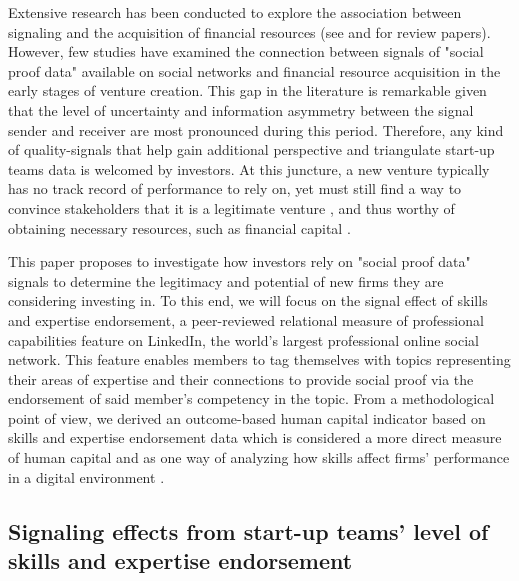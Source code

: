\documentclass[12pt]{article}
\begin{document}
Extensive research has been conducted to explore the association between signaling and the acquisition of financial resources (see \citep{connelly2011signaling} and \citet{colombo2021use} for review papers). However, few studies have examined the connection between signals of "social proof data" available on social networks and financial resource acquisition in the early stages of venture creation. This gap in the literature is remarkable given that the level of uncertainty \citep{matusik2008values} and information asymmetry between the signal sender and receiver \citep{spence2002signaling} are most pronounced during this period. Therefore, any kind of quality-signals that help gain additional perspective and triangulate start-up teams data is welcomed by investors. At this juncture, a new venture typically has no track record of performance to rely on, yet must still find a way to convince stakeholders that it is a legitimate venture \citep{becker2015new}, and thus worthy of obtaining necessary resources, such as financial capital \citep{ko2018signaling}.

This paper proposes to investigate how investors rely on "social proof data" signals to determine the legitimacy and potential of new firms they are considering investing in. To this end, we will focus on the signal effect of skills and expertise endorsement, a peer-reviewed relational measure of professional capabilities feature on LinkedIn, the world's largest professional online social network. This feature enables members to tag themselves with topics representing their areas of expertise and their connections to provide social proof via the endorsement of said member's competency in the topic. From a methodological point of view, we derived an outcome-based human capital indicator based on skills and expertise endorsement data which is considered a more direct measure of human capital and as one way of analyzing how skills affect firms' performance in a digital environment \citep{marvel2016human}.

\subsection{Signaling effects from start-up teams' level of skills and expertise endorsement}
\end{document}
